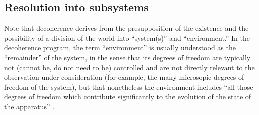 \documentclass[twocolumn,rmp,aps,amsmath,amsfonts,noshowkeys,noshowpacs]{revtex4}
\begin{document}
\subsection{Resolution into subsystems\label{sec:division}}

Note that decoherence derives from the presupposition of the existence
and the possibility of a division of the world into ``system(s)'' and
``environment.''  In the decoherence program, the term ``environment''
is usually understood as the ``remainder'' of the system, in the sense
that its degrees of freedom are typically not (cannot be, do not need
to be) controlled and are not directly relevant to the observation
under consideration (for example, the many microsopic degrees of
freedom of the system), but that nonetheless the environment includes
``all those degrees of freedom which contribute significantly to the
evolution of the state of the apparatus''
\citep[][p.~1520]{Zurek:1981:dd}.
\end{document}

